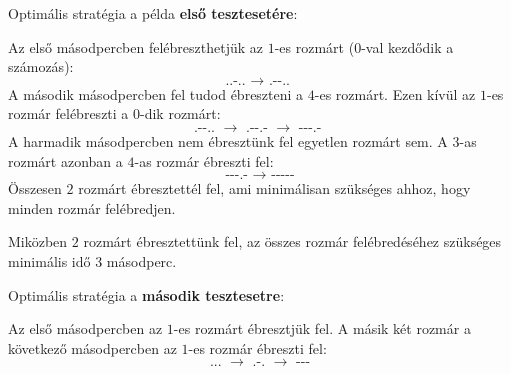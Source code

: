 \Examples
\begin{example}
%
\end{example}


\Explanation
Optimális stratégia a példa \textbf{első tesztesetére}:

Az első másodpercben felébreszthetjük az $1$-es rozmárt ($0$-val kezdődik a számozás):
$$\texttt{..-.. } \rightarrow \texttt{ .{-}-.. }$$
A második másodpercben fel tudod ébreszteni a $4$-es rozmárt. Ezen kívül az $1$-es rozmár felébreszti a $0$-dik rozmárt:
$$\texttt{.-{-}.. } \rightarrow \texttt{ .-{-}.- } \rightarrow \texttt{ -{-}-.- }$$
A harmadik másodpercben nem ébresztünk fel egyetlen rozmárt sem. A $3$-as rozmárt azonban a $4$-as rozmár ébreszti fel:
$$\texttt{-{-}-.- } \rightarrow \texttt{ -{-}-{-}-}$$
Összesen $2$ rozmárt ébresztettél fel, ami minimálisan szükséges ahhoz, hogy minden rozmár felébredjen.

Miközben $2$ rozmárt ébresztettünk fel, az összes rozmár felébredéséhez szükséges minimális idő $3$ másodperc.

Optimális stratégia a \textbf{második tesztesetre}:

Az első másodpercben az $1$-es rozmárt ébresztjük fel. A másik két rozmár a következő másodpercben az $1$-es rozmár ébreszti fel:
$$\texttt{... } \rightarrow \texttt{ .-. } \rightarrow \texttt{ -{-}-} $$











